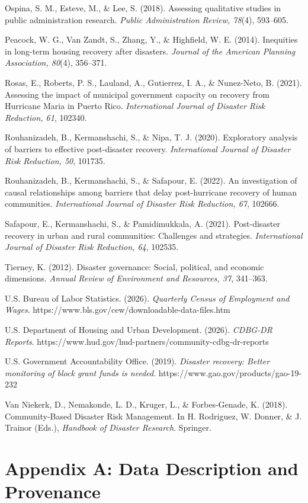 \documentclass[
  number]{elsarticle}
\begin{document}
Ospina, S. M., Esteve, M., \& Lee, S. (2018). Assessing qualitative
studies in public administration research. \emph{Public Administration
Review, 78}(4), 593--605.

Peacock, W. G., Van Zandt, S., Zhang, Y., \& Highfield, W. E. (2014).
Inequities in long-term housing recovery after disasters. \emph{Journal
of the American Planning Association, 80}(4), 356--371.

Rosas, E., Roberts, P. S., Lauland, A., Gutierrez, I. A., \& Nunez-Neto,
B. (2021). Assessing the impact of municipal government capacity on
recovery from Hurricane Maria in Puerto Rico. \emph{International
Journal of Disaster Risk Reduction, 61}, 102340.

Rouhanizadeh, B., Kermanshachi, S., \& Nipa, T. J. (2020). Exploratory
analysis of barriers to effective post-disaster recovery.
\emph{International Journal of Disaster Risk Reduction, 50}, 101735.

Rouhanizadeh, B., Kermanshachi, S., \& Safapour, E. (2022). An
investigation of causal relationships among barriers that delay
post-hurricane recovery of human communities. \emph{International
Journal of Disaster Risk Reduction, 67}, 102666.

Safapour, E., Kermanshachi, S., \& Pamidimukkala, A. (2021).
Post-disaster recovery in urban and rural communities: Challenges and
strategies. \emph{International Journal of Disaster Risk Reduction, 64},
102535.

Tierney, K. (2012). Disaster governance: Social, political, and economic
dimensions. \emph{Annual Review of Environment and Resources, 37},
341--363.

U.S. Bureau of Labor Statistics. (2026). \emph{Quarterly Census of
Employment and Wages}.
https://www.bls.gov/cew/downloadable-data-files.htm

U.S. Department of Housing and Urban Development. (2026). \emph{CDBG-DR
Reports}. https://www.hud.gov/hud-partners/community-cdbg-dr-reports

U.S. Government Accountability Office. (2019). \emph{Disaster recovery:
Better monitoring of block grant funds is needed}.
https://www.gao.gov/products/gao-19-232

Van Niekerk, D., Nemakonde, L. D., Kruger, L., \& Forbes-Genade, K.
(2018). Community-Based Disaster Risk Management. In H. Rodriguez, W.
Donner, \& J. Trainor (Eds.), \emph{Handbook of Disaster Research}.
Springer.

\newpage

\section*{Appendix A: Data Description and
Provenance}\label{appendix-a-data-description-and-provenance}
\end{document}
